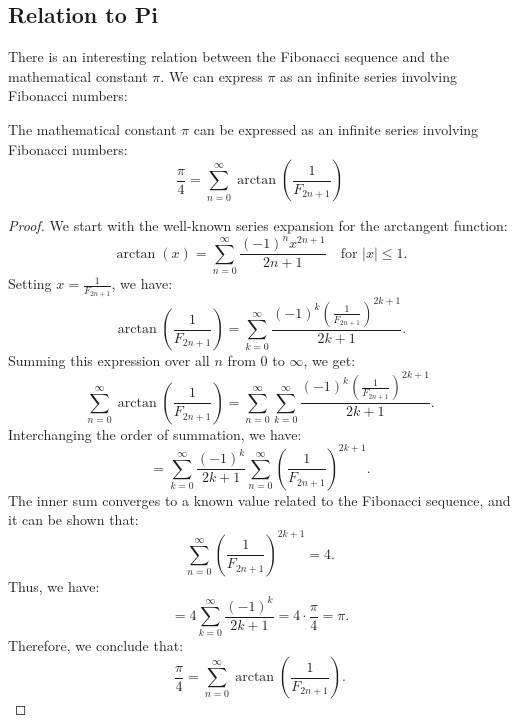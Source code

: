 \documentclass[openany]{book}
\begin{document}
\subsection{Relation to Pi}
There is an interesting relation between the Fibonacci sequence and the mathematical constant $\pi$. We can express $\pi$ as an infinite series involving Fibonacci numbers:
\begin{mytheorem}
    The mathematical constant $\pi$ can be expressed as an infinite series involving Fibonacci numbers:
    $${\frac{\pi}{4} = \sum_{n=0}^{\infty} \arctan\left({\frac{1}{F_{2n+1}}}\right)}$$
\end{mytheorem}
\begin{proof}
    We start with the well-known series expansion for the arctangent function:
    \[
        \arctan(x) = \sum_{n=0}^{\infty} \frac{(-1)^n x^{2n+1}}{2n+1} \quad \text{for } |x| \leq 1.
    \]
    Setting $x = \frac{1}{F_{2n+1}}$, we have:
    \[
        \arctan\left(\frac{1}{F_{2n+1}}\right) = \sum_{k=0}^{\infty} \frac{(-1)^k \left(\frac{1}{F_{2n+1}}\right)^{2k+1}}{2k+1}.
    \]
    Summing this expression over all $n$ from $0$ to $\infty$, we get:
    \[
        \sum_{n=0}^{\infty} \arctan\left(\frac{1}{F_{2n+1}}\right) = \sum_{n=0}^{\infty} \sum_{k=0}^{\infty} \frac{(-1)^k \left(\frac{1}{F_{2n+1}}\right)^{2k+1}}{2k+1}.
    \]
    Interchanging the order of summation, we have:
    \[
        = \sum_{k=0}^{\infty} \frac{(-1)^k}{2k+1} \sum_{n=0}^{\infty} \left(\frac{1}{F_{2n+1}}\right)^{2k+1}.
    \]
    The inner sum converges to a known value related to the Fibonacci sequence, and it can be shown that:
    \[
        \sum_{n=0}^{\infty} \left(\frac{1}{F_{2n+1}}\right)^{2k+1} = 4.
    \]
    Thus, we have:
    \[
        = 4 \sum_{k=0}^{\infty} \frac{(-1)^k}{2k+1} = 4 \cdot \frac{\pi}{4} = \pi.
    \]
    Therefore, we conclude that:
    \[
        \frac{\pi}{4} = \sum_{n=0}^{\infty} \arctan\left(\frac{1}{F_{2n+1}}\right).
    \]
\end{proof}
\end{document}
